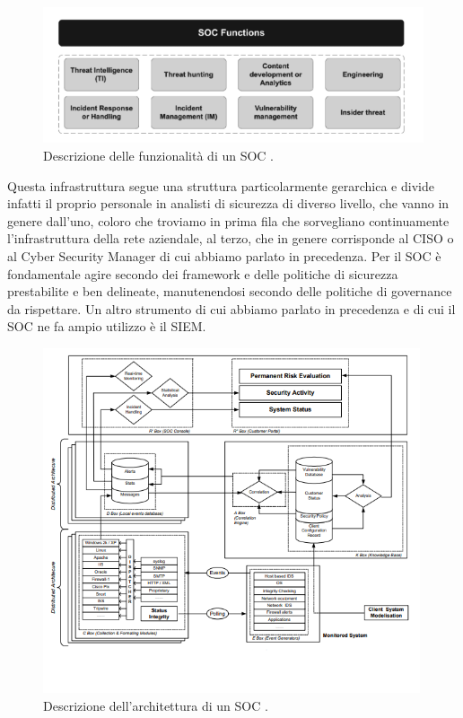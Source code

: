         \begin{figure}[H]
            \centering
            \includegraphics[width=1.0\textwidth]{Immagini/soc_functions.PNG}
            \caption{Descrizione delle funzionalità di un SOC \cite{soc_functions_book}.}
            \label{fig:soc_funcionts}
        \end{figure}

        Questa infrastruttura segue una struttura particolarmente gerarchica e divide infatti il proprio personale in analisti di sicurezza di diverso livello, che vanno in genere dall'uno, coloro che troviamo in prima fila che sorvegliano continuamente l'infrastruttura della rete aziendale, al terzo, che in genere corrisponde al CISO o al Cyber Security Manager di cui abbiamo parlato in precedenza. Per il SOC è fondamentale agire secondo dei framework e delle politiche di sicurezza prestabilite e ben delineate, manutenendosi secondo delle politiche di governance da rispettare. Un altro strumento di cui abbiamo parlato in precedenza e di cui il SOC ne fa ampio utilizzo è il SIEM.
        
        \newpage
        
        \begin{figure}[H]
            \centering
            \includegraphics[width=0.99\textwidth]{Immagini/soc_architecture.PNG}
            \caption{Descrizione dell'architettura di un SOC \cite{soc_architecture_pic}.}
            \label{fig:soc_architecture}
        \end{figure}

